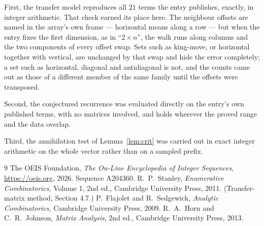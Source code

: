 \documentclass[11pt,a4paper]{article}
\theoremstyle{plain}
\theoremstyle{definition}
\begin{document}
First, the transfer model reproduces all $21$ terms the entry publishes, exactly, in
integer arithmetic. That check earned its place here. The neighbour offsets are named in the
array's own frame --- horizontal means along a row --- but when the entry fixes the first
dimension, as in ``$2\times n$'', the walk runs along columns and the two components of every
offset swap. Sets such as king-move, or horizontal together with vertical, are unchanged by
that swap and hide the error completely; a set such as horizontal, diagonal and antidiagonal
is not, and the counts came out as those of a different member of the same family until the
offsets were transposed.

Second, the conjectured recurrence was evaluated directly on the entry's own published terms,
with no matrices involved, and holds wherever the proved range and the data overlap.

Third, the annihilation test of Lemma~\ref{lem:crit} was carried out in exact integer
arithmetic on the whole vector rather than on a sampled prefix.

\begin{thebibliography}{9}
 The OEIS Foundation, \emph{The On-Line Encyclopedia of Integer
Sequences}, \url{https://oeis.org}, 2026. Sequence A204360.
 R.~P.~Stanley, \emph{Enumerative Combinatorics}, Volume 1, 2nd ed.,
Cambridge University Press, 2011. (Transfer-matrix method, Section 4.7.)
 P.~Flajolet and R.~Sedgewick, \emph{Analytic Combinatorics}, Cambridge
University Press, 2009.
 R.~A.~Horn and C.~R.~Johnson, \emph{Matrix Analysis}, 2nd ed., Cambridge
University Press, 2013.
\end{thebibliography}
\end{document}
